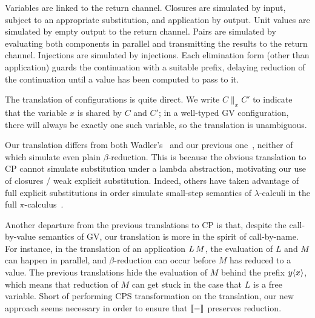 \documentclass[oribibl,orivec,envcountsame]{llncs}
\begin{document}
Variables are linked to the return channel. Closures are simulated by input, subject to an
appropriate substitution, and application by output. Unit values are simulated by empty output to
the return channel. Pairs are simulated by evaluating both components in parallel and transmitting
the results to the return channel. Injections are simulated by injections. Each elimination form
(other than application) guards the continuation with a suitable prefix, delaying reduction of the
continuation until a value has been computed to pass to it.

The translation of configurations is quite direct. We write $C \parallel_x C'$ to indicate that the
variable $x$ is shared by $C$ and $C'$; in a well-typed GV configuration, there will always be
exactly one such variable, so the translation is unambiguous.

Our translation differs from both Wadler's~\cite{Wadler14} and our previous one~\cite{LindleyM14},
neither of which simulate even plain $\beta$-reduction. This is because the obvious translation to
CP cannot simulate substitution under a lambda abstraction, motivating our use of closures / weak
explicit substitution.
%
Indeed, others have taken advantage of full explicit substitutions in order simulate small-step
semantics of $\lambda$-calculi in the full $\pi$-calculus~\cite{BakelV09}.

Another departure from the previous translations to CP is that, despite the call-by-value semantics
of GV, our translation is more in the spirit of call-by-name. For instance, in the translation of an
application $L \, M$, the evaluation of $L$ and $M$ can happen in parallel, and $\beta$-reduction
can occur before $M$ has reduced to a value. The previous translations hide the evaluation of $M$
behind the prefix $y\langle x\rangle$, which means that reduction of $M$ can get stuck in the case that $L$ is
a free variable.
%
Short of performing CPS transformation on the translation, our new approach seems necessary in order
to ensure that $\llbracket - \rrbracket$ preserves reduction.
\end{document}
